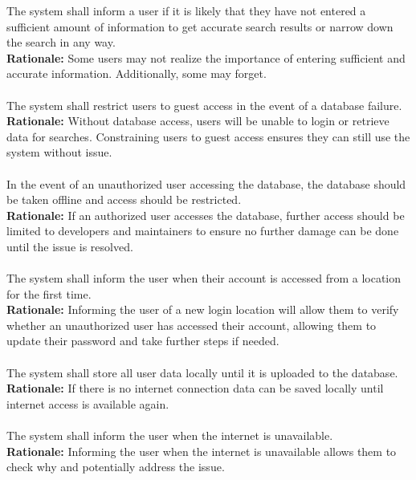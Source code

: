 \documentclass{article}
\begin{document}
The system shall inform a user if it is likely that they have not entered a sufficient amount of information to get accurate search results or narrow down the search in any way.\\
\textbf{Rationale:}
Some users may not realize the importance of entering sufficient and accurate information. Additionally, some may forget.\\~\\

The system shall restrict users to guest access in the event of a database failure.\\
\textbf{Rationale:}
Without database access, users will be unable to login or retrieve data for searches. Constraining users to guest access ensures they can still use the system without issue.\\~\\

In the event of an unauthorized user accessing the database, the database should be taken offline and access should be restricted.\\
\textbf{Rationale:}
If an authorized user accesses the database, further access should be limited to developers and maintainers to ensure no further damage can be done until the issue is resolved.\\~\\

The system shall inform the user when their account is accessed from a location for the first time. \\
\textbf{Rationale:}
Informing the user of a new login location will allow them to verify whether an unauthorized user has accessed their account, allowing them to update their password and take further steps if needed. \\~\\

The system shall store all user data locally until it is uploaded to the database. \\
\textbf{Rationale:}
If there is no internet connection data can be saved locally until internet access is available again.\\~\\

The system shall inform the user when the internet is unavailable. \\
\textbf{Rationale:}
Informing the user when the internet is unavailable allows them to check why and potentially address the issue. \\~\\
\end{document}
